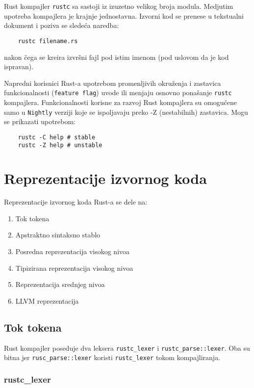 \documentclass{article}
\begin{document}
Rust kompajler \verb|rustc| sa sastoji iz izuzetno velikog broja modula. 
Medjutim upotreba kompajlera je krajnje jednostavna.
Izvorni kod se prenese u tekstualni dokument i poziva se sledeća naredba:
\begin{verbatim}
    rustc filename.rs
\end{verbatim}
nakon čega se kreira izvršni fajl pod istim imenom (pod uslovom da je kod ispravan).

Napredni korisnici Rust-a upotrebom promenljivih okruženja i zastavica funkcionalnosti 
(\verb|feature flag|) uvode ili menjaju osnovno ponašanje \verb|rustc| kompajlera.
Funkcionalnosti korisne za razvoj Rust kompajlera su omogućene samo u \verb|Nightly| verziji koje se
ispoljavaju preko -Z (nestabilnih) zastavica. Mogu se prikazati upotrebom:

\begin{verbatim}
    rustc -C help # stable
    rustc -Z help # unstable
\end{verbatim}


\section{Reprezentacije izvornog koda}

Reprezentacije izvornog koda Rust-a se dele na:

\begin{enumerate}    
    \item Tok tokena
    \item Apstraktno sintaksno stablo
    \item Posredna reprezentacija visokog nivoa
    \item Tipizirana reprezentacija visokog nivoa
    \item Reprezentacija srednjeg nivoa
    \item LLVM reprezentacija
\end{enumerate}


\subsection{Tok tokena}

Rust kompajler poseduje dva leksera \verb|rustc_lexer| i \verb|rustc_parse::lexer|. Oba su bitna 
jer \verb|rusc_parse::lexer| koristi \verb|rustc_lexer| tokom kompajliranja.

\subsubsection{rustc\_lexer}
\end{document}
